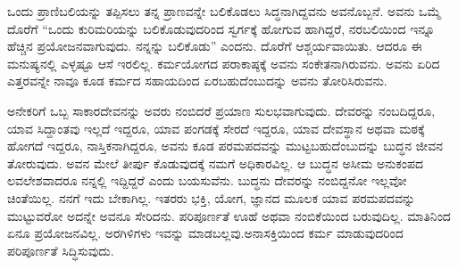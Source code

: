 ಒಂದು ಪ್ರಾಣಿಬಲಿಯನ್ನು ತಪ್ಪಿಸಲು ತನ್ನ ಪ್ರಾಣವನ್ನೇ ಬಲಿಕೊಡಲು ಸಿದ್ಧನಾಗಿದ್ದ\-ವನು ಅವನೊಬ್ಬನೆ. ಅವನು ಒಮ್ಮೆ ದೊರೆಗೆ “ಒಂದು ಕುರಿಮರಿಯನ್ನು ಬಲಿಕೊಡು\-ವುದರಿಂದ ಸ್ವರ್ಗಕ್ಕೆ ಹೋಗುವ ಹಾಗಿದ್ದರೆ, ನರಬಲಿಯಿಂದ ಇನ್ನೂ ಹೆಚ್ಚಿನ ಪ್ರಯೋಜನವಾಗುವುದು. ನನ್ನನ್ನು ಬಲಿಕೊಡು” ಎಂದನು. ದೊರೆಗೆ ಆಶ್ಚರ್ಯವಾಯಿತು. ಆದರೂ ಈ ಮನುಷ್ಯನಲ್ಲಿ ಎಳ್ಳಷ್ಟೂ ಆಸೆ ಇರಲಿಲ್ಲ. ಕರ್ಮಯೋಗದ ಪರಾಕಾಷ್ಠಕ್ಕೆ ಅವನು ಸಂಕೇತನಾಗಿರುವನು. ಅವನು ಏರಿದ ಎತ್ತರವನ್ನೇ ನಾವೂ ಕೂಡ ಕರ್ಮದ ಸಹಾಯದಿಂದ ಏರಬಹುದೆಂಬುದನ್ನು ಅವನು ತೋರಿಸಿರುವನು.

ಅನೇಕರಿಗೆ ಒಬ್ಬ ಸಾಕಾರದೇವನನ್ನು ಅವರು ನಂಬಿದರೆ ಪ್ರಯಾಣ ಸುಲಭವಾಗುವುದು. ದೇವರನ್ನು ನಂಬದಿದ್ದರೂ, ಯಾವ ಸಿದ್ದಾಂತವು ಇಲ್ಲದೆ ಇದ್ದರೂ, ಯಾವ ಪಂಗಡಕ್ಕೆ ಸೇರದೆ ಇದ್ದರೂ, ಯಾವ ದೇವಸ್ಥಾನ ಅಥವಾ ಮಠಕ್ಕೆ ಹೋಗದೆ ಇದ್ದರೂ, ನಾಸ್ತಿಕನಾಗಿದ್ದರೂ, ಅವನು ಕೂಡ ಪರಮಪದವನ್ನು ಮುಟ್ಟಬಹುದೆಂಬುದನ್ನು ಬುದ್ಧನ ಜೀವನ ತೋರುವುದು. ಅವನ ಮೇಲೆ ತೀರ್ಪು ಕೊಡುವುದಕ್ಕೆ ನಮಗೆ ಅಧಿಕಾರವಿಲ್ಲ. ಆ ಬುದ್ಧನ ಅಸೀಮ ಅನುಕಂಪದ ಲವಲೇಶವಾದರೂ ನನ್ನಲ್ಲಿ ಇದ್ದಿದ್ದರೆ ಎಂದು ಬಯಸುವೆನು. ಬುದ್ಧನು ದೇವರನ್ನು ನಂಬಿದ್ದನೋ ಇಲ್ಲವೋ ಚಿಂತೆಯಿಲ್ಲ. ನನಗೆ ಇದು ಬೇಕಾಗಿಲ್ಲ. ಇತರರು ಭಕ್ತಿ, ಯೋಗ, ಜ್ಞಾನದ ಮೂಲಕ ಯಾವ ಪರಮಪದವನ್ನು ಮುಟ್ಟುವರೋ ಅದನ್ನೇ ಅವನೂ ಸೇರಿದನು. ಪರಿಪೂರ್ಣತೆ ಊಹೆ ಅಥವಾ ನಂಬಿಕೆಯಿಂದ ಬರುವುದಿಲ್ಲ. ಮಾತಿನಿಂದ ಏನೂ ಪ್ರಯೋಜನವಿಲ್ಲ. ಅರಗಿಳಿಗಳು ಇವನ್ನು ಮಾಡಬಲ್ಲವು.\break ಅನಾಸಕ್ತಿಯಿಂದ ಕರ್ಮ ಮಾಡುವುದರಿಂದ ಪರಿಪೂರ್ಣತೆ ಸಿದ್ಧಿಸುವುದು.

